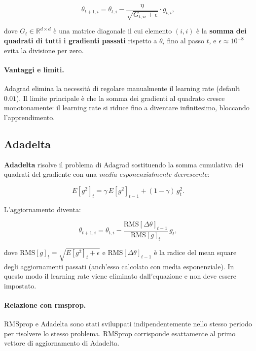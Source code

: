 \begin{equation}
  \theta_{t+1,i} = \theta_{t,i} - \frac{\eta}{\sqrt{G_{t,ii} + \epsilon}}
                   \cdot g_{t,i},
\end{equation}

dove $G_t \in \mathbb{R}^{d \times d}$ è una matrice diagonale il cui elemento
$(i,i)$ è la \textbf{somma dei quadrati di tutti i gradienti passati} rispetto
a $\theta_i$ fino al passo $t$, e $\epsilon \approx 10^{-8}$ evita la
divisione per zero.

\paragraph{Vantaggi e limiti.}
Adagrad elimina la necessità di regolare manualmente il learning rate (default
$0.01$). Il limite principale è che la somma dei gradienti al quadrato cresce
monotonamente: il learning rate si riduce fino a diventare infinitesimo,
bloccando l'apprendimento.

\subsection{Adadelta}
\label{subsec:adadelta}

\textbf{Adadelta} risolve il problema di Adagrad sostituendo la somma
cumulativa dei quadrati del gradiente con una \emph{media esponenzialmente
decrescente}:

\begin{equation}
  E[g^2]_t = \gamma\, E[g^2]_{t-1} + (1-\gamma)\, g_t^2.
\end{equation}

L'aggiornamento diventa:

\begin{equation}
  \theta_{t+1,i} = \theta_{t,i} - \frac{\text{RMS}[\Delta\theta]_{t-1}}
                                        {\text{RMS}[g]_t}\, g_t,
\end{equation}

dove $\text{RMS}[g]_t = \sqrt{E[g^2]_t + \epsilon}$ e
$\text{RMS}[\Delta\theta]_{t-1}$ è la radice del mean square degli aggiornamenti
passati (anch'esso calcolato con media esponenziale). In questo modo il learning
rate viene eliminato dall'equazione e non deve essere impostato.

\paragraph{Relazione con rmsprop.}
RMSprop e Adadelta sono stati sviluppati indipendentemente nello stesso periodo
per risolvere lo stesso problema. RMSprop corrisponde esattamente al primo
vettore di aggiornamento di Adadelta.

